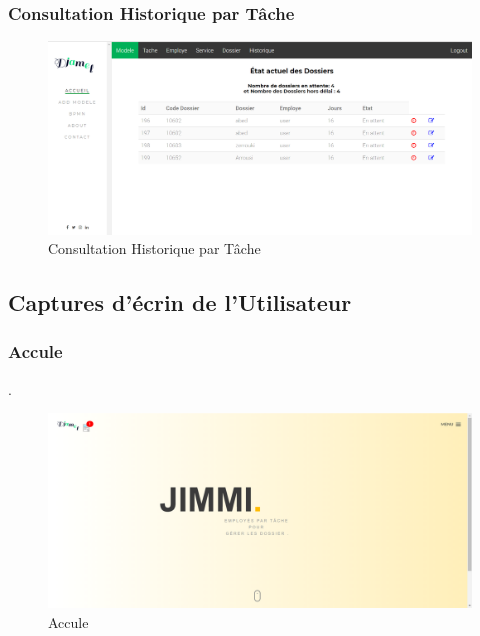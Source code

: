 \subsubsection{ Consultation Historique par Tâche }
\begin{figure}[H]
	\centering
	\includegraphics[width=1\linewidth]{images/captures/capturesadmin/HTache}
	\caption{Consultation Historique par Tâche}
	\label{fig:htache}
\end{figure}


 \subsection{Captures d'écrin de l'Utilisateur }
\subsubsection{ Accule  }.

\begin{figure}
	\centering
	\includegraphics[width=1\linewidth]{images/captures/capturesuser/home}
	\caption{Accule}
	\label{fig:home}
\end{figure}
